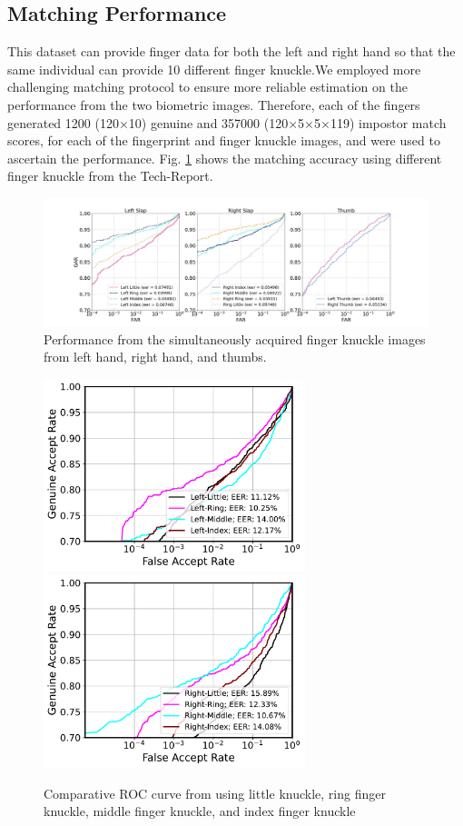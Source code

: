\subsection{Matching Performance}
This dataset can provide finger data for both the left and right hand so that the same individual can provide 10 different finger knuckle.We employed more challenging matching protocol to ensure more reliable estimation on the performance from the two biometric images. Therefore, each of the fingers generated 1200 (120×10) genuine and 357000 (120×5×5×119) impostor match scores, for each of the fingerprint and finger knuckle images, and were used to ascertain the performance. Fig. \ref{tech-report} shows the matching accuracy using different finger knuckle from the Tech-Report.
\begin{figure}[h]
    \centering
    \includegraphics[width=7in]{Figure/09-09-2022/peformance.jpg}
    \caption{Performance from the simultaneously acquired finger knuckle images from left hand, right hand, and thumbs.}
    \label{tech-report}
\end{figure}
\begin{figure}[h]
    \centering
    \includegraphics[width=3in]{Figure/09-09-2022/left-roc.pdf}
    \includegraphics[width=3in]{Figure/09-09-2022/right-roc.pdf}
    \caption{Comparative ROC curve from using little knuckle, ring finger knuckle, middle finger knuckle, and index finger knuckle}
    \label{rfn}
\end{figure}

